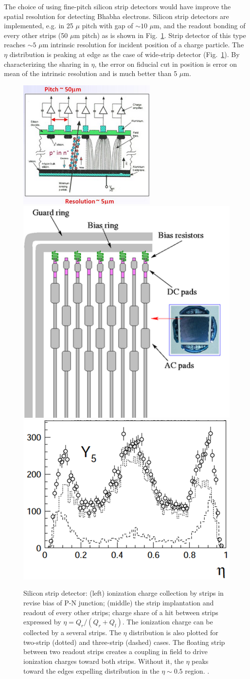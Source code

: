 The choice of using fine-pitch silicon strip detectors would have improve the spatial resolution for detecting Bhabha electrons. Silicon strip detectors are implemented, e.g. in 25 $\mu$ pitch with gap of $\sim 10$ $\mu$m, and the readout bonding of every other strips (50 $\mu$m pitch) as is shown in Fig.~\ref{fig:strip_detector}. Strip detector of this type reaches $\sim 5$ $\mu$m intrinsic resolution for incident position of a charge particle. The $\eta$ distribution is peaking at edge as the case of wide-strip detector (Fig.~\ref{fig:strip_detector}). By characterizing the sharing in $\eta$, the error on fiducial cut in position is error on mean of the intrinsic resolution and is much better than 5 $\mu$m.

\begin{figure}[t!]  %
	\centering
	\includegraphics[width=.28\linewidth]{Figures/MDI/strip_cutview.png} 
	\hspace{.4cm}
	\includegraphics[width=.25\linewidth]{Figures/MDI/strip_implant.png}  
	\hspace{.4cm}
	\includegraphics[width=.34\linewidth]{Figures/MDI/strip_eta.png} 
	\vspace{.2cm}
	\caption{  
		Silicon strip detector: (left) ionization charge collection by strips in revise bias of P-N junction; (middle) the strip implantation and readout of every other strips; charge share of a hit between strips expressed by $\eta=Q_r/(Q_r+Q_l)$. The ionization charge can be collected by a several strips. The $\eta$ distribution is also plotted for two-strip (dotted) and three-strip (dashed) cases. The floating strip between two readout strips creates a coupling in field to drive ionization charges toward both strips. Without it, the $\eta$ peaks toward the edges expelling distribution in the $\eta\sim 0.5$ region.
		\cite{NIM_reso}.
		\label{fig:strip_detector} }
\end{figure}


